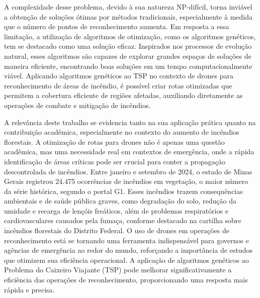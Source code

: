 \documentclass[
	12pt,				%
	openright,			%
	oneside,			%
	a4paper,			%
	chapter=TITLE,		%
	subsection=TITLE,	%
	english,			%
	brazil,				%
	]{abntex2}
\begin{document}
A complexidade desse problema, devido à sua natureza NP-difícil, torna inviável a obtenção de soluções ótimas por métodos tradicionais, especialmente à medida que o número de pontos de reconhecimento aumenta. Em resposta a essa limitação, a utilização de algoritmos de otimização, como os algoritmos genéticos, tem se destacado como uma solução eficaz. Inspirados nos processos de evolução natural, esses algoritmos são capazes de explorar grandes espaços de soluções de maneira eficiente, encontrando boas soluções em um tempo computacionalmente viável. Aplicando algoritmos genéticos ao TSP no contexto de drones para reconhecimento de áreas de incêndio, é possível criar rotas otimizadas que permitem a cobertura eficiente de regiões afetadas, auxiliando diretamente as operações de combate e mitigação de incêndios.

A relevância deste trabalho se evidencia tanto na sua aplicação prática quanto na contribuição acadêmica, especialmente no contexto do aumento de incêndios florestais. A otimização de rotas para drones não é apenas uma questão acadêmica, mas uma necessidade real em contextos de emergência, onde a rápida identificação de áreas críticas pode ser crucial para conter a propagação descontrolada de incêndios. Entre janeiro e setembro de 2024, o estado de Minas Gerais registrou 24.475 ocorrências de incêndios em vegetação, o maior número da série histórica, segundo o portal G1. Esses incêndios trazem consequências ambientais e de saúde pública graves, como degradação do solo, redução da umidade e recarga de lençóis freáticos, além de problemas respiratórios e cardiovasculares causados pela fumaça, conforme destacado na cartilha sobre incêndios florestais do Distrito Federal. O uso de drones em operações de reconhecimento está se tornando uma ferramenta indispensável para governos e agências de emergência ao redor do mundo, reforçando a importância de estudos que otimizem sua eficiência operacional. A aplicação de algoritmos genéticos ao Problema do Caixeiro Viajante (TSP) pode melhorar significativamente a eficiência das operações de reconhecimento, proporcionando uma resposta mais rápida e precisa.

\end{document}

